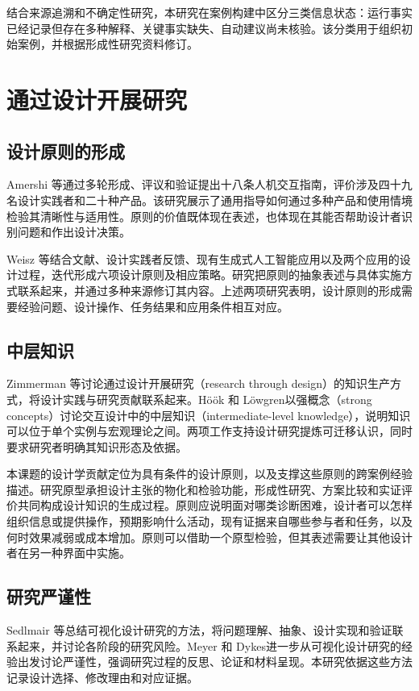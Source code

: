 结合来源追溯和不确定性研究，本研究在案例构建中区分三类信息状态：运行事实已经记录但存在多种解释、关键事实缺失、自动建议尚未核验。该分类用于组织初始案例，并根据形成性研究资料修订。

\section{通过设计开展研究}

\subsection{设计原则的形成}

Amershi 等\cite{ref48}通过多轮形成、评议和验证提出十八条人机交互指南，评价涉及四十九名设计实践者和二十种产品。该研究展示了通用指导如何通过多种产品和使用情境检验其清晰性与适用性。原则的价值既体现在表述，也体现在其能否帮助设计者识别问题和作出设计决策。

Weisz 等\cite{ref66}结合文献、设计实践者反馈、现有生成式人工智能应用以及两个应用的设计过程，迭代形成六项设计原则及相应策略。研究把原则的抽象表述与具体实施方式联系起来，并通过多种来源修订其内容。上述两项研究表明，设计原则的形成需要经验问题、设计操作、任务结果和应用条件相互对应。

\subsection{中层知识}

Zimmerman 等\cite{zimmerman2007rtd}讨论通过设计开展研究（research through design）的知识生产方式，将设计实践与研究贡献联系起来。Höök 和 Löwgren\cite{hook2012strong}以强概念（strong concepts）讨论交互设计中的中层知识（intermediate-level knowledge），说明知识可以位于单个实例与宏观理论之间。两项工作支持设计研究提炼可迁移认识，同时要求研究者明确其知识形态及依据。

本课题的设计学贡献定位为具有条件的设计原则，以及支撑这些原则的跨案例经验描述。研究原型承担设计主张的物化和检验功能，形成性研究、方案比较和实证评价共同构成设计知识的生成过程。原则应说明面对哪类诊断困难，设计者可以怎样组织信息或提供操作，预期影响什么活动，现有证据来自哪些参与者和任务，以及何时效果减弱或成本增加。原则可以借助一个原型检验，但其表述需要让其他设计者在另一种界面中实施。

\subsection{研究严谨性}

Sedlmair 等\cite{sedlmair2012design}总结可视化设计研究的方法，将问题理解、抽象、设计实现和验证联系起来，并讨论各阶段的研究风险。Meyer 和 Dykes\cite{meyer2020rigor}进一步从可视化设计研究的经验出发讨论严谨性，强调研究过程的反思、论证和材料呈现。本研究依据这些方法记录设计选择、修改理由和对应证据。

